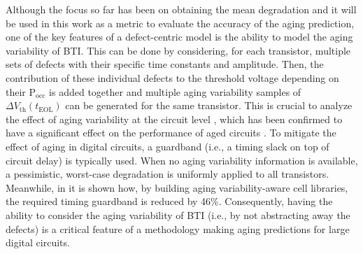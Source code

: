 Although the focus so far has been on obtaining the mean degradation and it will be used in this work as a metric to evaluate the accuracy of the aging prediction, one of the key features of a defect-centric model is the ability to model the aging variability of BTI. This can be done by considering, for each transistor, multiple sets of defects with their specific time constants and amplitude. Then, the contribution of these individual defects to the threshold voltage depending on their $\text{P}_{\text{occ}}$ is added together and multiple aging variability samples of $\Delta V_\text{th}({t_\text{EOL}})$ can be generated for the same transistor. This is crucial to analyze the effect of aging variability at the circuit level \cite{santana-andreoImpactBTIHCI2022,toro-friasFastAccurateReliability2015,vansantenModelingMitigatingTimeDependent2019}, which has been confirmed to have a significant effect on the performance of aged circuits \cite{santana-andreoReliabilityImprovementSRAM2024a, santana-andreoCharacterizingAgingDegradation2022, saraza-canflancaSmartSRAMCellArray2022}. To mitigate the effect of aging in digital circuits, a guardband (i.e., a timing slack on top of circuit delay) is typically used. When no aging variability information is available, a pessimistic, worst-case degradation is uniformly applied to all transistors. Meanwhile, in \cite{vansantenModelingMitigatingTimeDependent2019} it is shown how, by building aging variability-aware cell libraries, the required timing guardband is reduced by 46\%. Consequently, having the ability to consider the aging variability of \gls{BTI} (i.e., by not abstracting away the defects) is a critical feature of a methodology making aging predictions for large digital circuits. 

